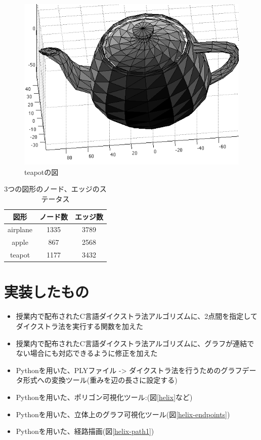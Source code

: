 \documentclass[a4paper,11pt]{jsarticle}
\begin{document}
\begin{figure}[H]
  \centering
  \includegraphics[scale = 0.8]{../Figs/teapot.png} 
  \caption{teapotの図}
  \label{teapot}
\end{figure}


\begin{table}[H]
  \centering\begin{tabular}{ccc}
  図形 & ノード数 & エッジ数 \\
  \hline
  airplane & 1335 & 3789 \\
  apple & 867 & 2568 \\
  teapot & 1177 & 3432 \\
  \hline
  \end{tabular}
  \caption{3つの図形のノード、エッジのステータス}
  \label{node-edge}
\end{table}

\section{実装したもの}

\begin{itemize}
  \item 授業内で配布されたC言語ダイクストラ法アルゴリズムに、2点間を指定してダイクストラ法を実行する関数を加えた
  \item 授業内で配布されたC言語ダイクストラ法アルゴリズムに、グラフが連結でない場合にも対応できるように修正を加えた
  \item Pythonを用いた、PLYファイル -> ダイクストラ法を行うためのグラフデータ形式への変換ツール(重みを辺の長さに設定する)
  \item Pythonを用いた、ポリゴン可視化ツール:(図\ref{helix}など)
  \item Pythonを用いた、立体上のグラフ可視化ツール(図\ref{helix-endpoints})
  \item Pythonを用いた、経路描画(図\ref{helix-path1})
\end{itemize}
\end{document}
